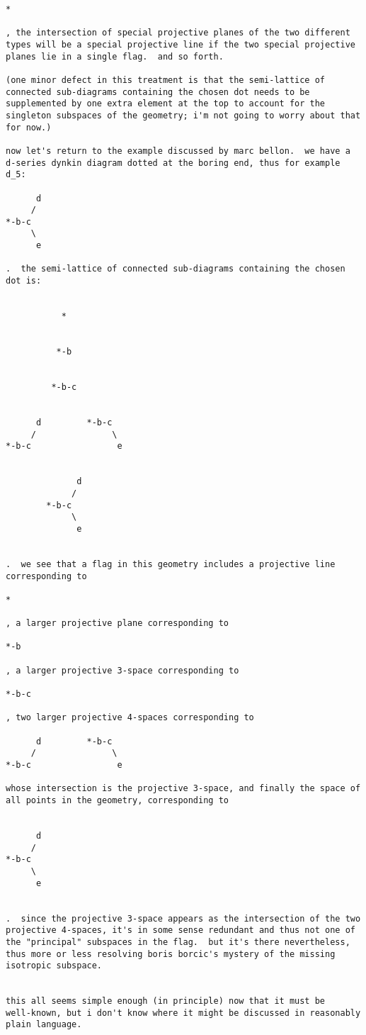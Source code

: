 \begin{verbatim}
*

, the intersection of special projective planes of the two different
types will be a special projective line if the two special projective
planes lie in a single flag.  and so forth.

(one minor defect in this treatment is that the semi-lattice of
connected sub-diagrams containing the chosen dot needs to be
supplemented by one extra element at the top to account for the
singleton subspaces of the geometry; i'm not going to worry about that
for now.)

now let's return to the example discussed by marc bellon.  we have a
d-series dynkin diagram dotted at the boring end, thus for example
d_5:

      d
     /
*-b-c
     \
      e

.  the semi-lattice of connected sub-diagrams containing the chosen
dot is:


           *


          *-b


         *-b-c


      d         *-b-c
     /               \ 
*-b-c                 e


              d
             /
        *-b-c
             \
              e


.  we see that a flag in this geometry includes a projective line
corresponding to

*

, a larger projective plane corresponding to

*-b

, a larger projective 3-space corresponding to

*-b-c

, two larger projective 4-spaces corresponding to

      d         *-b-c
     /               \ 
*-b-c                 e

whose intersection is the projective 3-space, and finally the space of
all points in the geometry, corresponding to


      d
     /
*-b-c
     \
      e


.  since the projective 3-space appears as the intersection of the two
projective 4-spaces, it's in some sense redundant and thus not one of
the "principal" subspaces in the flag.  but it's there nevertheless,
thus more or less resolving boris borcic's mystery of the missing
isotropic subspace.


this all seems simple enough (in principle) now that it must be
well-known, but i don't know where it might be discussed in reasonably
plain language.
\end{verbatim}
    




